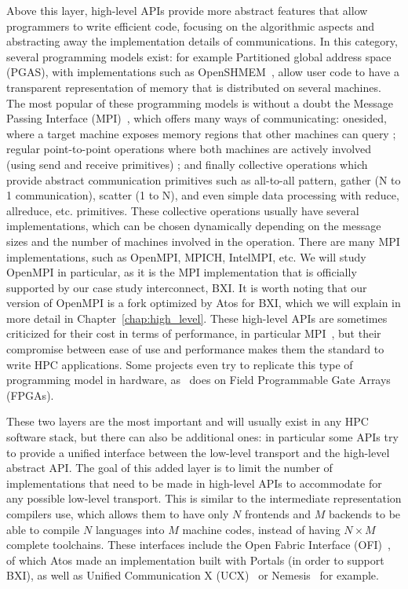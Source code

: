 Above this layer, high-level APIs provide more abstract features that allow
programmers to write efficient code, focusing on the algorithmic aspects and
abstracting away the implementation details of communications. In this category,
several programming models exist: for example Partitioned global address space
(PGAS), with implementations such as OpenSHMEM~\cite{Chapman2010}, allow user
code to have a transparent representation of memory that is distributed on
several machines. The most popular of these programming models is without a
doubt the Message Passing Interface (MPI)~\cite{Graham2006}, which offers many
ways of communicating: onesided, where a target machine exposes memory regions
that other machines can query ; regular point-to-point operations where both
machines are actively involved (using send and receive primitives) ; and finally
collective operations which provide abstract communication primitives such as
all-to-all pattern, gather (N to 1 communication), scatter (1 to N), and even
simple data processing with reduce, allreduce, etc. primitives. These collective
operations usually have several implementations, which can be chosen dynamically
depending on the message sizes and the number of machines involved in the
operation. There are many MPI implementations, such as OpenMPI, MPICH, IntelMPI,
etc. We will study OpenMPI in particular, as it is the MPI implementation that
is officially supported by our case study interconnect, BXI. It is worth noting
that our version of OpenMPI is a fork optimized by Atos for BXI, which we will
explain in more detail in Chapter~\ref{chap:high_level}. These high-level APIs
are sometimes criticized for their cost in terms of performance, in particular
MPI~\cite{Raffenetti2017}, but their compromise between ease of use and
performance makes them the standard to write HPC applications. Some projects
even try to replicate this type of programming model in hardware,
as~\cite{DeMatteis2019} does on Field Programmable Gate Arrays
(FPGAs).

These two layers are the most important and will usually exist in any HPC
software stack, but there can also be additional ones: in particular some APIs
try to provide a unified interface between the low-level transport and the
high-level abstract API. The goal of this added layer is to limit the number of
implementations that need to be made in high-level APIs to accommodate for any
possible low-level transport. This is similar to the intermediate representation
compilers use, which allows them to have only $N$ frontends and $M$ backends to
be able to compile $N$ languages into $M$ machine codes, instead of having $N
\times M$ complete toolchains. These interfaces include the Open Fabric
Interface (OFI)~\cite{Grun}, of which Atos made an implementation built with
Portals (in order to support BXI), as well as Unified Communication X
(UCX)~\cite{Shamis2015} or Nemesis~\cite{Pritchard2011} for example.


